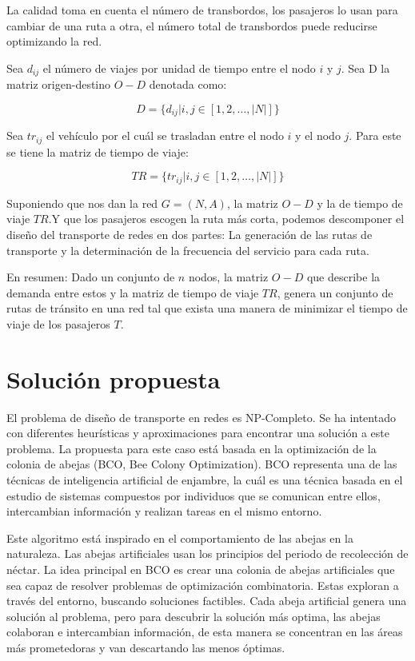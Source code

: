 \documentclass[letterpaper,12pt]{article}
\begin{document}
La calidad toma en cuenta el número de transbordos, los pasajeros lo usan 
para cambiar de una ruta a otra, el número total de transbordos puede 
reducirse optimizando la red.

Sea $d_{ij}$ el número de viajes por unidad de tiempo entre el nodo $i$ y $j$.
Sea D la matriz origen-destino $O-D$ denotada como:

$$ D = \{ d_{ij} | i,j \in [1, 2, \dots , |N| ] \} $$

Sea $tr_{ij}$ el vehículo por el cuál se trasladan entre el nodo $i$ y el 
nodo $j$. Para este se tiene la matriz de tiempo de viaje:

$$ TR = \{ tr_{ij} | i,j \in [1, 2, \dots, |N|] \} $$

Suponiendo que nos dan la red $G=(N,A)$, la matriz $O-D$ y la de tiempo de 
viaje $TR$.Y que los pasajeros escogen la ruta más corta, podemos 
descomponer el diseño del transporte de redes en dos partes: La generación 
de las rutas de transporte y la determinación de la frecuencia del 
servicio para cada ruta.

En resumen: Dado un conjunto de $n$ nodos, la matriz $O-D$ que describe la 
demanda entre estos y la matriz de tiempo de viaje $TR$, genera un conjunto 
de rutas de tránsito en una red tal que exista una manera de minimizar 
el tiempo de viaje de los pasajeros $T$.

\section{Solución propuesta}

El problema de diseño de transporte en redes es  NP-Completo. Se ha intentado 
con diferentes heurísticas y aproximaciones para encontrar una solución a 
este problema. La propuesta para este caso está basada en la optimización de 
la colonia de abejas (BCO, Bee Colony Optimization). BCO representa una de 
las técnicas de inteligencia artificial de enjambre, la cuál es una técnica 
basada en el estudio de sistemas compuestos por individuos que se comunican 
entre ellos, intercambian información y realizan tareas en el mismo entorno.

Este algoritmo está inspirado en el comportamiento de las abejas en la 
naturaleza. Las abejas artificiales usan los principios del periodo de 
recolección de néctar. La idea principal en BCO es crear una colonia 
de abejas artificiales que sea capaz de resolver problemas de optimización 
combinatoria. Estas exploran a través del entorno, buscando soluciones 
factibles. Cada abeja artificial genera una solución al problema, pero para 
descubrir la solución más optima, las abejas colaboran e intercambian 
información, de esta manera se concentran en las áreas más prometedoras y van 
descartando las menos óptimas.
\end{document}
